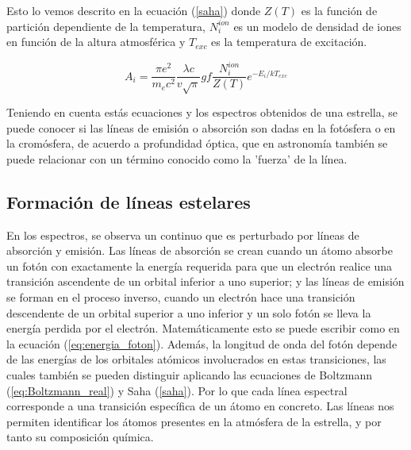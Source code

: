 \documentclass[12pt,oneside,openany,letter]{book}
\begin{document}
\noindent Esto lo vemos descrito en la ecuación (\ref{saha}) donde $Z(T)$ es la función de partición dependiente de la temperatura, $N_i^{ion}$ es un modelo de densidad de iones en función de la altura atmosférica y $T_{exc}$ es la temperatura de excitación.

\begin{equation}
A_{i} = \frac{\pi e^{2}}{m_{e} c^{2}} \frac{\lambda c}{v \sqrt{\pi}} g f \frac{N_{i}^{ion}}{Z(T)} e^{-E_{i} / k T_{exc}}
\label{saha}
\end{equation}

\noindent Teniendo en cuenta estás ecuaciones y los espectros obtenidos de una estrella, se puede conocer si las líneas de emisión o absorción son dadas en la fotósfera o en la cromósfera, de acuerdo a profundidad óptica, que en astronomía también se puede relacionar con un término conocido como la 'fuerza' de la línea.

\subsection{Formación de líneas estelares}
En los espectros, se observa un continuo que es perturbado por líneas de absorción y emisión. Las líneas de absorción se crean cuando un átomo absorbe un fotón con exactamente la energía requerida para que un electrón realice una transición ascendente de un orbital inferior a uno superior; y las líneas de emisión se forman en el proceso inverso, cuando un electrón hace una transición descendente de un orbital superior a uno inferior y un solo fotón se lleva la energía perdida por el electrón.  Matemáticamente esto se puede escribir como en la ecuación (\ref{eq:energia_foton}). Además, la longitud de onda del fotón depende de las energías de los orbitales atómicos involucrados en estas transiciones, las cuales también se pueden distinguir aplicando las ecuaciones de Boltzmann (\ref{eq:Boltzmann_real}) y Saha (\ref{saha}). Por lo que cada línea espectral corresponde a una transición específica de un átomo en concreto. Las líneas nos permiten identificar los átomos presentes en la atmósfera de la estrella, y por tanto su composición química.
\end{document}
